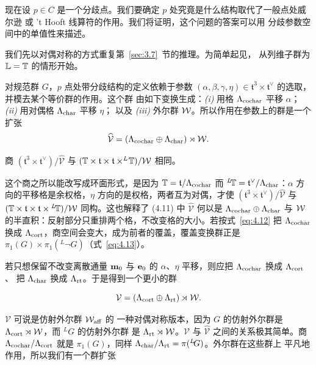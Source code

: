 现在设 $p\in C$ 是一个分歧点。我们要确定
$p$ 处究竟是什么结构取代了一般点处威尔逊
或 't Hooft 线算符的作用。我们将证明，这个问题的答案可以用
分歧参数空间中的单值性来描述。

\bigskip{}

我们先以对偶对称的方式重复第~\ref{sec:3.7}~节的推理。为简单起见，
从列维子群为 $\mathbb{L}={\mathbb{T}}$ 的情形开始。

对规范群 $G$，$p$ 点处带分歧结构的定义依赖于参数
$(\alpha,\beta,\gamma,\eta)\in \mathfrak t^3\times \mathfrak t^\vee$
的选取，并模去某个等价群的作用。这个群
由如下变换生成：{\it (i)} 用格 $\Lambda_{\rm cochar}$ 平移 $\alpha$；
{\it (ii)} 用对偶格 $\Lambda_{\rm char}$ 平移 $\eta$；
以及 {\it (iii)} 外尔群 ${\mathcal W}$。所以作用在参数上的群是一个
扩张
\setcounter{equation}{10}
\begin{equation}\label{eq:4.11}
  \widehat {\mathcal
V}=\left(\Lambda_{\rm cochar}\oplus\Lambda_{\rm char}\right)\rtimes{\mathcal W}.
\end{equation}

商 $(\mathfrak t^3\times \mathfrak t^\vee)/\hat{\mathcal V}$ 与
$({\mathbb{T}}\times \mathfrak t\times\mathfrak t\times ^L\negthinspace{\mathbb{T}})/{\mathcal W}$ 相同。

\begin{yizhu}[含糊点拨]这个商之所以能改写成环面形式，是因为 ${\mathbb{T}}=\mathfrak t/\Lambda_{\rm cochar}$ 而 $^L\negthinspace{\mathbb{T}}=\mathfrak t^\vee/\Lambda_{\rm char}$：$\alpha$ 方向的平移格是余权格，$\eta$ 方向的是权格，两者互为对偶，才使 $(\mathfrak t^3\times\mathfrak t^\vee)/\hat{\mathcal V}$ 与 $({\mathbb{T}}\times\mathfrak t\times\mathfrak t\times{}^L\negthinspace{\mathbb{T}})/{\mathcal W}$ 同构。这也解释了 (4.11) 中 $\hat{\mathcal V}$ 何以是 $\Lambda_{\rm cochar}\oplus\Lambda_{\rm char}$ 与 ${\mathcal W}$ 的半直积：反射部分只重排两个格，不改变格的大小。若按式~\eqref{eq:4.12} 把 $\Lambda_{\rm cochar}$ 换成 $\Lambda_{\rm cort}$，商空间会变大，成为前者的覆盖，覆盖变换群正是 $\pi_1(G)\times\pi_1({}^L\neg G)$（式~\eqref{eq:4.13}）。\end{yizhu}

若只想保留不改变离散通量 ${\bf m}_0$ 与 ${\bf e}_0$ 的
$\alpha$、$\eta$ 平移，则应把 $\Lambda_{\rm cochar}$ 换成 $\Lambda_{\rm cort}$、
把 $\Lambda_{\rm char}$ 换成 $\Lambda_{\rm rt}$。于是得到一个更小的群

\setcounter{equation}{11}
\begin{equation}\label{eq:4.12}
  {\mathcal
V}=\left(\Lambda_{\rm cort}\oplus\Lambda_{\rm rt}\right)\rtimes{\mathcal W}.
\end{equation}

${\mathcal V}$ 可说是仿射外尔群 ${\mathcal W}_{\rm aff}$ 的
一种对偶对称版本，因为 $G$ 的仿射外尔群是
$\Lambda_{\rm cort}\rtimes {\mathcal W}$，而 $^LG$ 的仿射外尔群
是 $\Lambda_{\rm rt}\rtimes {\mathcal W}$。${\mathcal
V}$ 与 $\hat {\mathcal V}$ 之间的关系极其简单。商
$\Lambda_{\rm cochar}/\Lambda_{\rm cort}$ 就是 $\pi_1(G)$，同样
$\Lambda_{\rm char}/\Lambda_{\rm rt}=\pi({}^L\negthinspace G)$。外尔群在这些群上
平凡地作用，所以我们有一个群扩张

